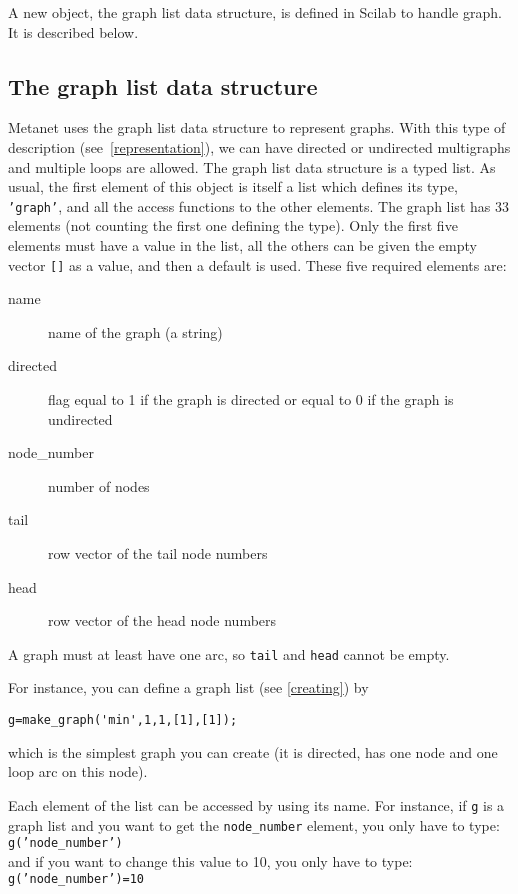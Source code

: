 \documentclass[11pt]{article}
\begin{document}
A new object, the graph list data structure, is defined in
Scilab to handle graph. It is described below.

\subsection{The graph list data structure} \label{graph-list}
Metanet uses the graph list data structure to represent graphs.
With this type of description (see~\ref{representation}), we can 
have directed or undirected
multigraphs and multiple loops are allowed.
The graph list data structure is a typed list. 
As usual, the first element of this object is itself a list which
defines its 
type, \texttt{'graph'}, 
and all the access functions to the other elements.
The graph list has 33 elements (not counting the first one defining the type).
Only the first five elements must have a value in the list,
all the others can be given the empty vector \texttt{[]} as a value, and then a
default is used. These five required elements are:
\begin{description}
  \item[name] name of the graph (a string)
  \item[directed] flag equal to 1 if the graph is directed or equal
  to 0 if the graph is undirected
  \item[node\_number] number of nodes
  \item[tail] row vector of the tail node numbers
  \item[head] row vector of the head node numbers
\end{description}
\noindent A graph must at least have one arc, so \texttt{tail} and 
\texttt{head}
cannot be empty. 


For instance, you can define a graph list (see \ref{creating}) by
\begin{verbatim}
g=make_graph('min',1,1,[1],[1]);
\end{verbatim}
which is the simplest graph you can create (it is directed, has 
one node and one loop arc on this node).

Each element of the list can be accessed by using its name.
For instance, if \texttt{g} is a graph list and
you want to get the \texttt{node\_number} element, you only have to type:\\
\texttt{g('node\_number')}\\
and if you want to change this value to 10, you only have to type:\\
\texttt{g('node\_number')=10}
\end{document}
